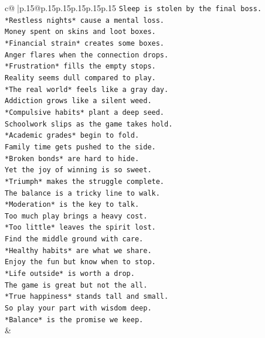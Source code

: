 \documentclass{article}
\begin{document}
{\begin{supertabular}{c@{$\;$}|p{.15\linewidth}@{}p{.15\linewidth}p{.15\linewidth}p{.15\linewidth}p{.15\linewidth}p{.15\linewidth}}
{{{\texttt{Sleep is stolen by the final boss.} \\
\texttt{*Restless nights* cause a mental loss.} \\
\texttt{Money spent on skins and loot boxes.} \\
\texttt{*Financial strain* creates some boxes.} \\
\texttt{Anger flares when the connection drops.} \\
\texttt{*Frustration* fills the empty stops.} \\
\texttt{Reality seems dull compared to play.} \\
\texttt{*The real world* feels like a gray day.} \\
\texttt{Addiction grows like a silent weed.} \\
\texttt{*Compulsive habits* plant a deep seed.} \\
\texttt{Schoolwork slips as the game takes hold.} \\
\texttt{*Academic grades* begin to fold.} \\
\texttt{Family time gets pushed to the side.} \\
\texttt{*Broken bonds* are hard to hide.} \\
\texttt{Yet the joy of winning is so sweet.} \\
\texttt{*Triumph* makes the struggle complete.} \\
\texttt{The balance is a tricky line to walk.} \\
\texttt{*Moderation* is the key to talk.} \\
\texttt{Too much play brings a heavy cost.} \\
\texttt{*Too little* leaves the spirit lost.} \\
\texttt{Find the middle ground with care.} \\
\texttt{*Healthy habits* are what we share.} \\
\texttt{Enjoy the fun but know when to stop.} \\
\texttt{*Life outside* is worth a drop.} \\
\texttt{The game is great but not the all.} \\
\texttt{*True happiness* stands tall and small.} \\
\texttt{So play your part with wisdom deep.} \\
\texttt{*Balance* is the promise we keep.} \\
            }
        }
    }
    & \\ \\


\end{supertabular}}
\end{document}
